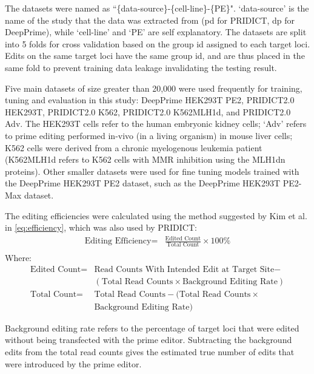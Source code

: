 The datasets were named as ``\{data-source\}-\{cell-line\}-\{PE\}". `data-source' is the name of the study that the data was extracted from (pd for PRIDICT, dp for DeepPrime), while `cell-line' and `PE' are self explanatory. The datasets are split into 5 folds for cross validation based on the group id assigned to each target loci. Edits on the same target loci have the same group id, and are thus placed in the same fold to prevent training data leakage invalidating the testing result. 

Five main datasets of size greater than 20,000 were used frequently for training, tuning and evaluation in this study: DeepPrime HEK293T PE2, PRIDICT2.0 HEK293T, PRIDICT2.0 K562, PRIDICT2.0 K562MLH1d, and PRIDICT2.0 Adv. The HEK293T cells refer to the human embryonic kidney cells\cite{kavsanImmortalizedCellsOne2011}; `Adv' refers to prime editing performed in-vivo (in a living organism) in mouse liver cells; K562 cells were derived from a chronic myelogenous leukemia patient\cite{lozzioMultipotentialLeukemiaCell1981} (K562MLH1d refers to K562 cells with MMR inhibition using the MLH1dn proteins). Other smaller datasets were used for fine tuning models trained with the DeepPrime HEK293T PE2 dataset, such as the DeepPrime HEK293T PE2-Max dataset.

The editing efficiencies were calculated using the method suggested by Kim et al.\cite{kimPredictingEfficiencyPrime2021} in \autoref{eq:efficiency}, which was also used by PRIDICT:
\begin{equation}
    \label{eq:efficiency}
    \begin{split}
        \text{Editing Efficiency} =& \frac{\text{Edited Count}}{\text{Total Count}} \times 100\% \\
    \end{split}
\end{equation}
Where:
\begin{equation}
    \begin{split}
        \text{Edited Count} =& \text{Read Counts With Intended Edit at Target Site} - \\
        &( \text{Total Read Counts} \times \text{Background Editing  Rate} ) \\
        \text{Total Count} =& \text{Total Read Counts} - (\text{Total Read Counts} \times \\ &\text{Background Editing  Rate})
    \end{split}
\end{equation}
        
Background editing rate refers to the percentage of target loci that were edited without being transfected with the prime editor. Subtracting the background edits from the total read counts gives the estimated true number of edits that were introduced by the prime editor.

